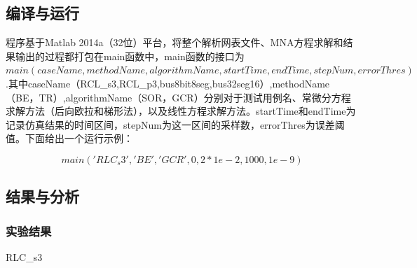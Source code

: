 \documentclass[12pt]{article}
\begin{document}
\subsection{编译与运行}
程序基于Matlab 2014a（32位）平台，将整个解析网表文件、MNA方程求解和结果输出的过程都打包在main函数中，main函数的接口为$main(caseName,methodName,algorithmName,startTime,endTime,stepNum,errorThres)$.其中caseName（RCL_s3,RCL_p3,bus8bit8seg,bus32seg16）,methodName（BE，TR）,algorithmName（SOR，GCR）分别对于测试用例名、常微分方程求解方法（后向欧拉和梯形法），以及线性方程求解方法。startTime和endTime为记录仿真结果的时间区间，stepNum为这一区间的采样数，errorThres为误差阈值。下面给出一个运行示例：

\begin{equation}
  main('RLC_s3','BE','GCR',0 ,2*1e-2,1000,1e-9)
\end{equation}

\subsection{结果与分析}
\subsubsection{实验结果}
RLC_s3


\qquad \par
\qquad \par
\qquad \par
\qquad \par
\qquad \par
\qquad \par
\qquad \par
\qquad \par
\qquad \par
\qquad \par
\qquad \par
\qquad \par
\qquad \par
\qquad \par
\qquad \par
\qquad \par






\end{document}
